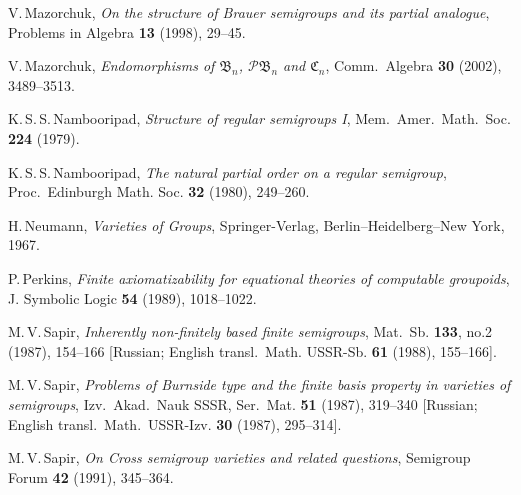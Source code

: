 \documentclass[11pt,reqno]{amsart}
\numberwithin{equation}{section}
\theoremstyle{remark}
\def\C{\mathfrak{C}}
\def\B{\mathfrak{B}}
\begin{document}
\begin{thebibliography}{99}
V.\,Mazorchuk, \emph{On the structure of Brauer semigroups and its
partial analogue}, Problems in Algebra \textbf{13} (1998), 29--45.

V.\,Mazorchuk, \emph{Endomorphisms of $\B_n$, ${\mathcal P}\B_n$
and $\C_n$}, Comm.\ Algebra \textbf{30} (2002), 3489--3513.



K.\,S.\,S.\,Nambooripad, \emph{Structure of regular semigroups I},
Mem.\ Amer.\ Math.\ Soc. \textbf{224} (1979).

K.\,S.\,S.\,Nambooripad, \emph{The natural partial order on a
regular semigroup}, Proc.\ Edinburgh Math. Soc. \textbf{32}
(1980), 249--260.

H.\,Neumann, \emph{Varieties of Groups}, Springer-Verlag,
Berlin--Heidelberg--New York, 1967.



P.\,Perkins, \emph{Finite axiomatizability for equational theories
of computable groupoids}, J. Symbolic Logic \textbf{54} (1989),
1018--1022.


M.\,V.\,Sapir, \emph{Inherently non-finitely based finite
semigroups}, Mat.\ Sb. \textbf{133}, no.2 (1987), 154--166
[Russian; English transl.\ Math. USSR-Sb. \textbf{61} (1988),
155--166].

M.\,V.\,Sapir, \emph{Problems of Burnside type and the finite
basis property in varieties of semigroups}, Izv.\ Akad.\ Nauk
SSSR, Ser.\ Mat. \textbf{51} (1987), 319--340 [Russian; English
transl.\ Math.\ USSR-Izv. \textbf{30} (1987), 295--314].

M.\,V.\,Sapir, \emph{On Cross semigroup varieties and related
questions}, Semigroup Forum \textbf{ 42} (1991), 345--364.


\end{thebibliography}
\end{document}
